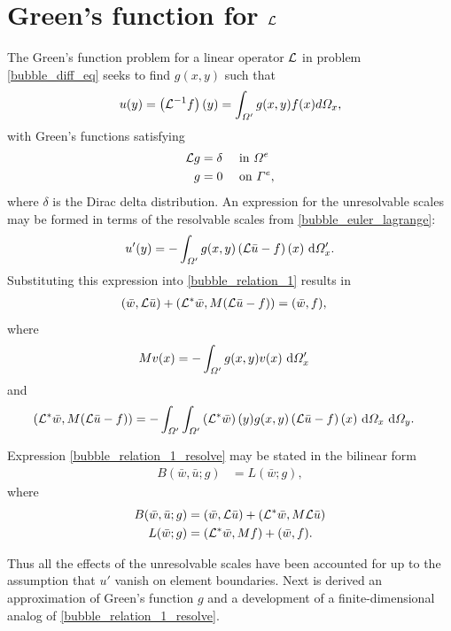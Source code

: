 \section{Green's function for $\mathcal{L}$}

The Green's function problem for a linear operator $\mathcal{L}$ in problem \cref{bubble_diff_eq} seeks to find $g(x,y)$ such that
$$u(y) = \left(\mathcal{L}^{-1}f\right)(y) = \int_{\varOmega'} g(x,y)f(x)d\varOmega_x,$$
with Green's functions satisfying
\begin{align*}
  \mathcal{L} g &= \delta &&\text{ in } \varOmega^e \\
  g     &= 0 &&\text{ on } \varGamma^e,
\end{align*}
where $\delta$ is the Dirac delta distribution.  An expression for the unresolvable scales may be formed in terms of the resolvable scales from \cref{bubble_euler_lagrange}:
\begin{align}
  \label{greens_ftn_prob}
  u'(y) = - \int_{\varOmega'} g(x,y) \left(\mathcal{L}\bar{u} - f\right)(x) \ \mathrm{d}\varOmega_x'.
\end{align}
Substituting this expression into \cref{bubble_relation_1} results in
\begin{align}
  \label{bubble_relation_1_resolve}
  (\bar{w}, \mathcal{L} \bar{u}) + (\mathcal{L}^* \bar{w}, M(\mathcal{L}\bar{u} - f)) &= (\bar{w}, f),
\end{align}
where
\begin{align}
  \label{subgrid_scale_integral}
  M v(x) &= - \int_{\varOmega'} g(x,y) v(x) \ \mathrm{d}\varOmega_x'
\end{align}
and
{\small
\begin{align*}
  (\mathcal{L}^* \bar{w}, M(\mathcal{L}\bar{u} - f)) &= - \int_{\varOmega'} \int_{\varOmega'} \left( \mathcal{L}^* \bar{w} \right)(y) g(x,y) \left( \mathcal{L} \bar{u} - f \right)(x) \ \mathrm{d}\varOmega_x \ \mathrm{d}\varOmega_y.
\end{align*}}

Expression \cref{bubble_relation_1_resolve} may be stated in the bilinear form
\begin{align*}
  B(\bar{w}, \bar{u}; g) &= L(\bar{w}; g),
\end{align*}
where
\begin{align*}
  B(\bar{w}, \bar{u}; g) &= (\bar{w}, \mathcal{L} \bar{u}) + (\mathcal{L}^* \bar{w}, M \mathcal{L}\bar{u}) \\
  L(\bar{w}; g) &= (\mathcal{L}^* \bar{w}, Mf) + (\bar{w}, f).
\end{align*}

Thus all the effects of the unresolvable scales have been accounted for up to the assumption that $u'$ vanish on element boundaries.  Next is derived an approximation of Green's function $g$ and a development of a finite-dimensional analog of \cref{bubble_relation_1_resolve}.




